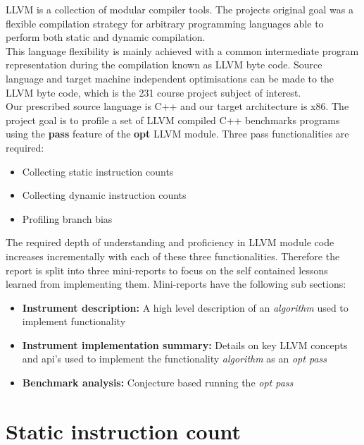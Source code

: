 \documentclass[letterpaper,twocolumn,10pt]{article}
\begin{document}
LLVM is a collection of modular compiler tools. The projects original goal was a flexible compilation strategy for arbitrary programming languages able to perform both static and dynamic compilation.\\
This language flexibility is mainly achieved with a common intermediate program representation during the compilation known as LLVM byte code. Source language and target machine independent optimisations can be made to the LLVM byte code, which is the 231 course project subject of interest.\\
Our prescribed source language is C++ and our target architecture is x86. The project goal is to profile a set of LLVM compiled C++ benchmarks programs using the \textbf{pass} feature of the \textbf{opt} LLVM module.
Three pass functionalities are required:
\begin{itemize}
\item{Collecting static instruction counts}
\item{Collecting dynamic instruction counts}
\item{Profiling branch bias }
\end{itemize}
The required depth of understanding and proficiency in LLVM module code increases incrementally with each of these three functionalities. Therefore the report is split into three mini-reports to focus on the self contained lessons learned from implementing them. Mini-reports have the following sub sections:\\
\begin{itemize}
\item{\textbf{Instrument description: }A high level description of an \textit{algorithm} used to implement functionality}
\item{\textbf{Instrument implementation summary: }Details on key LLVM concepts and api's used to implement the functionality \textit{algorithm} as an \textit{opt pass}}
\item{\textbf{Benchmark analysis: }Conjecture based running the \textit{opt pass}}
\end{itemize}    
 
\section{Static instruction count}
\end{document}
